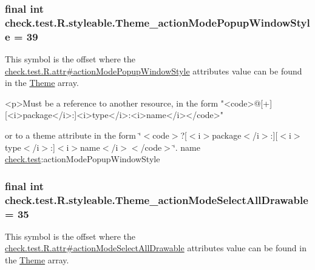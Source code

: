 \subsubsection[{Theme\+\_\+action\+Mode\+Popup\+Window\+Style}]{\setlength{\rightskip}{0pt plus 5cm}final int check.\+test.\+R.\+styleable.\+Theme\+\_\+action\+Mode\+Popup\+Window\+Style = 39\hspace{0.3cm}{\ttfamily [static]}}\label{classcheck_1_1test_1_1_r_1_1styleable_a7430b605b613f3c152e57fba4ec0f106}
This symbol is the offset where the \hyperlink{classcheck_1_1test_1_1_r_1_1attr_a9f20226af5f3450ddc9b63afe84c2e96}{check.\+test.\+R.\+attr\#action\+Mode\+Popup\+Window\+Style} attribute\textquotesingle{}s value can be found in the \hyperlink{classcheck_1_1test_1_1_r_1_1styleable_acca726d02016a0cf607782ec3a436a81}{Theme} array.

\begin{DoxyVerb}      <p>Must be a reference to another resource, in the form "<code>@[+][<i>package</i>:]<i>type</i>:<i>name</i></code>"
\end{DoxyVerb}
 or to a theme attribute in the form \char`\"{}$<$code$>$?\mbox{[}$<$i$>$package$<$/i$>$\+:\mbox{]}\mbox{[}$<$i$>$type$<$/i$>$\+:\mbox{]}$<$i$>$name$<$/i$>$$<$/code$>$\char`\"{}.  name \hyperlink{namespacecheck_1_1test}{check.\+test}\+:action\+Mode\+Popup\+Window\+Style \hypertarget{classcheck_1_1test_1_1_r_1_1styleable_a0b1f83e691b070515cd68592dacf387b}{}
\subsubsection[{Theme\+\_\+action\+Mode\+Select\+All\+Drawable}]{\setlength{\rightskip}{0pt plus 5cm}final int check.\+test.\+R.\+styleable.\+Theme\+\_\+action\+Mode\+Select\+All\+Drawable = 35\hspace{0.3cm}{\ttfamily [static]}}\label{classcheck_1_1test_1_1_r_1_1styleable_a0b1f83e691b070515cd68592dacf387b}
This symbol is the offset where the \hyperlink{classcheck_1_1test_1_1_r_1_1attr_a3c633deb9c01f4bdde7415f1db6815b0}{check.\+test.\+R.\+attr\#action\+Mode\+Select\+All\+Drawable} attribute\textquotesingle{}s value can be found in the \hyperlink{classcheck_1_1test_1_1_r_1_1styleable_acca726d02016a0cf607782ec3a436a81}{Theme} array.

